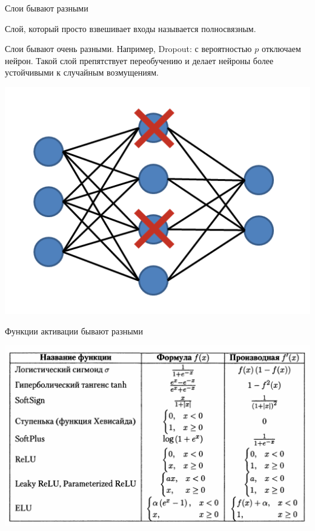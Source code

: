 \documentclass[notes,12pt, aspectratio=169]{beamer}
\newenvironment{wideitemize}{\itemize\addtolength{\itemsep}{10pt}}{\enditemize}
\begin{document}
\begin{frame}{Слои бывают разными}
	\begin{wideitemize}
		\item Слой, который просто взвешивает входы называется \alert{полносвязным.}
		
		\item Слои бывают очень разными. Например, \alert{Dropout:}  с вероятностью $p$ отключаем нейрон. Такой слой препятствует переобучению и делает нейроны более устойчивыми к случайным возмущениям.
	\end{wideitemize}
	\begin{center}
		\includegraphics[width=0.3\paperwidth]{dropout.png}
	\end{center}
\end{frame}


\begin{frame}{Функции активации бывают разными}
\begin{center}
	\includegraphics[width=0.7\paperwidth]{activations.png}
\end{center}
\end{frame}
\end{document}

